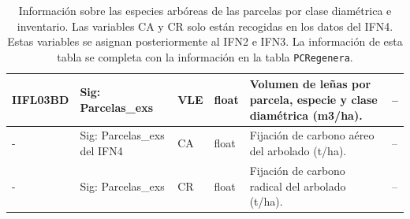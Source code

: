 \begin{table}[H]
{\begin{tabular}{|>{\centering\arraybackslash}m{1.5cm}|>{\centering\arraybackslash}m{3.5cm}|>{\centering\arraybackslash}m{3.5cm}|>{\centering\arraybackslash}m{2cm}|m{5cm}|>{\centering\arraybackslash}m{2cm}|}
\hline
IIFL03BD & Sig: Parcelas\_exs & VLE & float & Volumen de leñas por parcela, especie y clase diamétrica (m3/ha). & -- \\
\hline
- & Sig: Parcelas\_exs del IFN4 & CA & float & Fijación de carbono aéreo del arbolado (t/ha). & -- \\
\hline
- & Sig: Parcelas\_exs & CR & float & Fijación de carbono radical del arbolado (t/ha). & -- \\
\hline
\end{tabular}%
}
\caption{Información sobre las especies arbóreas de las parcelas por clase diamétrica e inventario. Las variables CA y CR solo están recogidas en los datos del IFN4. Estas variables se asignan posteriormente al IFN2 e IFN3. La información de esta tabla se completa con la información en la tabla \texttt{PCRegenera}.}
\label{tab:parcela_inventario_especie_cd}
\end{table}




